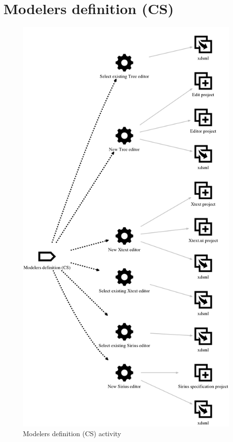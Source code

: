 \documentclass{gemoc} %
\begin{document}
\section{Modelers definition (CS)}
\label{sec:Modelers_definition__CS_}
\begin{figure}[h!]
		\center
		\includegraphics*[trim=0.0cm 0.0cm 0cm 0.0cm, clip=true]{fig/Modelers_definition__CS_}
		\caption{Modelers definition (CS) activity}
		\label{fig:Modelers_definition__CS_}
\end{figure}
\end{document}

